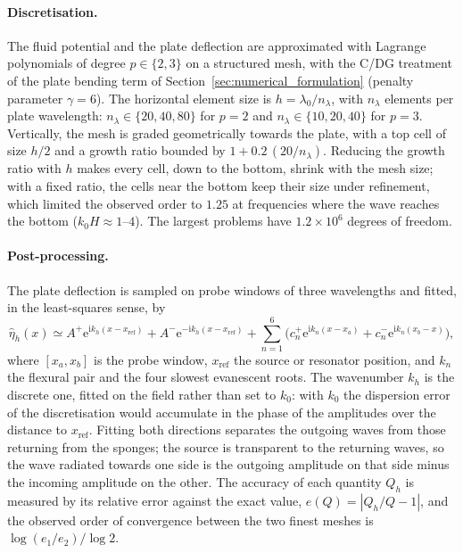 {\paragraph{Discretisation.} The fluid potential and the plate deflection are approximated with Lagrange polynomials of degree $p\in\{2,3\}$ on a structured mesh, with the C/DG treatment of the plate bending term of Section~\ref{sec:numerical_formulation} (penalty parameter $\gamma=6$). The horizontal element size is $h=\lambda_0/n_\lambda$, with $n_\lambda$ elements per plate wavelength: $n_\lambda\in\{20,40,80\}$ for $p=2$ and $n_\lambda\in\{10,20,40\}$ for $p=3$. Vertically, the mesh is graded geometrically towards the plate, with a top cell of size $h/2$ and a growth ratio bounded by $1+0.2\,(20/n_\lambda)$. Reducing the growth ratio with $h$ makes every cell, down to the bottom, shrink with the mesh size; with a fixed ratio, the cells near the bottom keep their size under refinement, which limited the observed order to $1.25$ at frequencies where the wave reaches the bottom ($k_0H\approx1$--$4$). The largest problems have $1.2\times10^6$ degrees of freedom.

\paragraph{Post-processing.} The plate deflection is sampled on probe windows of three wavelengths and fitted, in the least-squares sense, by
\begin{equation}\label{eq:num_wave_fit}
    \widehat{\eta}_h(x)\simeq A^+\mathrm{e}^{\mathrm{i}k_h(x-x_\mathrm{ref})}+A^-\mathrm{e}^{-\mathrm{i}k_h(x-x_\mathrm{ref})}+\sum_{n=1}^{6}\Big(c_n^+\mathrm{e}^{\mathrm{i}k_n(x-x_a)}+c_n^-\mathrm{e}^{\mathrm{i}k_n(x_b-x)}\Big),
\end{equation}
where $[x_a,x_b]$ is the probe window, $x_\mathrm{ref}$ the source or resonator position, and $k_n$ the flexural pair and the four slowest evanescent roots. The wavenumber $k_h$ is the discrete one, fitted on the field rather than set to $k_0$: with $k_0$ the dispersion error of the discretisation would accumulate in the phase of the amplitudes over the distance to $x_\mathrm{ref}$. Fitting both directions separates the outgoing waves from those returning from the sponges; the source is transparent to the returning waves, so the wave radiated towards one side is the outgoing amplitude on that side minus the incoming amplitude on the other. The accuracy of each quantity $Q_h$ is measured by its relative error against the exact value, $e(Q)=|Q_h/Q-1|$, and the observed order of convergence between the two finest meshes is $\log(e_1/e_2)/\log 2$.

}
